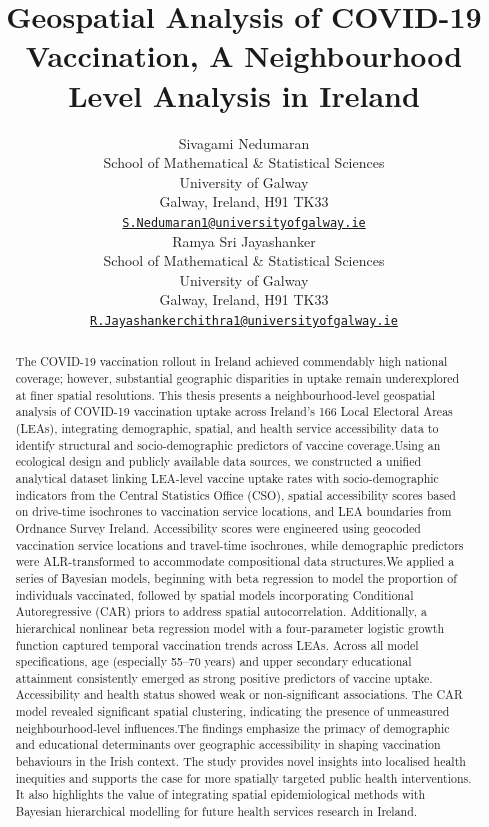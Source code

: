 \documentclass{article}
\title{Geospatial Analysis of COVID-19 Vaccination, A Neighbourhood
Level Analysis in Ireland}
\author{
    Sivagami Nedumaran
   \\
    School of Mathematical \& Statistical Sciences \\
    University of Galway \\
  Galway, Ireland, H91 TK33 \\
  \texttt{\href{mailto:S.Nedumaran1@universityofgalway.ie}{\nolinkurl{S.Nedumaran1@universityofgalway.ie}}} \\
   \And
    Ramya Sri Jayashanker
   \\
    School of Mathematical \& Statistical Sciences \\
    University of Galway \\
  Galway, Ireland, H91 TK33 \\
  \texttt{\href{mailto:R.Jayashankerchithra1@universityofgalway.ie}{\nolinkurl{R.Jayashankerchithra1@universityofgalway.ie}}} \\
  }
\begin{document}
\maketitle


\begin{abstract}
The COVID-19 vaccination rollout in Ireland achieved commendably high
national coverage; however, substantial geographic disparities in uptake
remain underexplored at finer spatial resolutions. This thesis presents
a neighbourhood-level geospatial analysis of COVID-19 vaccination uptake
across Ireland's 166 Local Electoral Areas (LEAs), integrating
demographic, spatial, and health service accessibility data to identify
structural and socio-demographic predictors of vaccine coverage.Using an
ecological design and publicly available data sources, we constructed a
unified analytical dataset linking LEA-level vaccine uptake rates with
socio-demographic indicators from the Central Statistics Office (CSO),
spatial accessibility scores based on drive-time isochrones to
vaccination service locations, and LEA boundaries from Ordnance Survey
Ireland. Accessibility scores were engineered using geocoded vaccination
service locations and travel-time isochrones, while demographic
predictors were ALR-transformed to accommodate compositional data
structures.We applied a series of Bayesian models, beginning with beta
regression to model the proportion of individuals vaccinated, followed
by spatial models incorporating Conditional Autoregressive (CAR) priors
to address spatial autocorrelation. Additionally, a hierarchical
nonlinear beta regression model with a four-parameter logistic growth
function captured temporal vaccination trends across LEAs. Across all
model specifications, age (especially 55--70 years) and upper secondary
educational attainment consistently emerged as strong positive
predictors of vaccine uptake. Accessibility and health status showed
weak or non-significant associations. The CAR model revealed significant
spatial clustering, indicating the presence of unmeasured
neighbourhood-level influences.The findings emphasize the primacy of
demographic and educational determinants over geographic accessibility
in shaping vaccination behaviours in the Irish context. The study
provides novel insights into localised health inequities and supports
the case for more spatially targeted public health interventions. It
also highlights the value of integrating spatial epidemiological methods
with Bayesian hierarchical modelling for future health services research
in Ireland.
\end{abstract}
\end{document}
